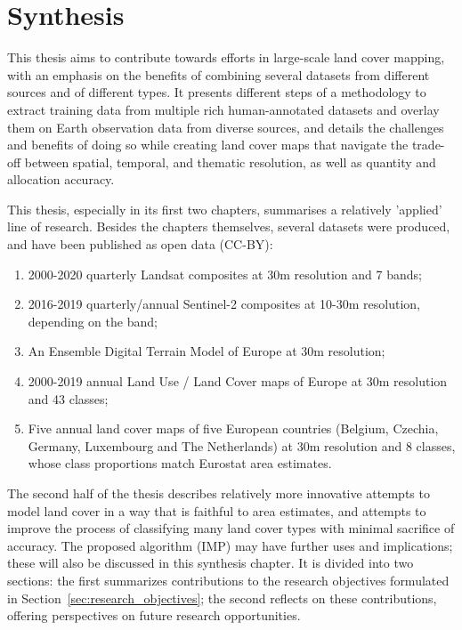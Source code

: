 \chapter[Synthesis]{Synthesis}
\label{cha:Chapter6}
\newpage

This thesis aims to contribute towards efforts in large-scale land cover mapping, with an emphasis on the benefits of combining several datasets from different sources and of different types. It presents different steps of a methodology to extract training data from multiple rich human-annotated datasets and overlay them on Earth observation data from diverse sources, and details the challenges and benefits of doing so while creating land cover maps that navigate the trade-off between spatial, temporal, and thematic resolution, as well as quantity and allocation accuracy.

This thesis, especially in its first two chapters, summarises a relatively 'applied' line of research. Besides the chapters themselves, several datasets were produced, and have been published as open data (CC-BY):
\begin{enumerate}
    \item 2000-2020 quarterly Landsat composites at 30m resolution and 7 bands;
    \item 2016-2019 quarterly/annual Sentinel-2 composites at 10-30m resolution, depending on the band;
    \item An Ensemble Digital Terrain Model of Europe at 30m resolution;
    \item 2000-2019 annual Land Use / Land Cover maps of Europe at 30m resolution and 43 classes;
    \item Five annual land cover maps of five European countries (Belgium, Czechia, Germany, Luxembourg and The Netherlands) at 30m resolution and 8 classes, whose class proportions match Eurostat area estimates.
\end{enumerate}
The second half of the thesis describes relatively more innovative attempts to model land cover in a way that is faithful to area estimates, and attempts to improve the process of classifying many land cover types with minimal sacrifice of accuracy. The proposed algorithm (IMP) may have further uses and implications; these will also be discussed in this synthesis chapter. It is divided into two sections: the first summarizes contributions to the research objectives formulated in Section~\ref{sec:research_objectives}; the second reflects on these contributions, offering perspectives on future research opportunities. 

